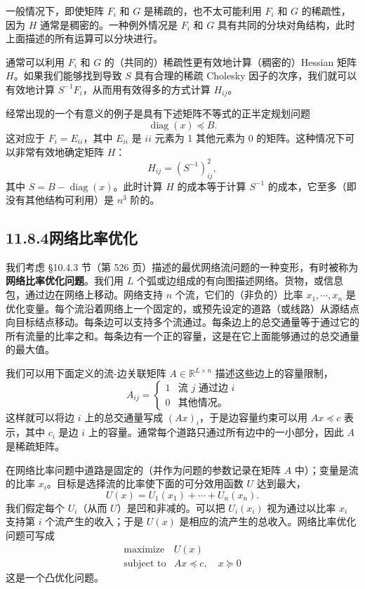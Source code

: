 \documentclass[UTF8,12pt,a4paper,fontset=fandol]{ctexart}
\begin{document}
一般情况下，即使矩阵 $F_i$ 和 $G$ 是稀疏的，也不太可能利用 $F_i$ 和 $G$ 的稀疏性，因为 $H$ 通常是稠密的。一种例外情况是 $F_i$ 和 $G$ 具有共同的分块对角结构，此时上面描述的所有运算可以分块进行。

通常可以利用 $F_i$ 和 $G$ 的（共同的）稀疏性更有效地计算（稠密的）Hessian 矩阵 $H$。如果我们能够找到导致 $S$ 具有合理的稀疏 Cholesky 因子的次序，我们就可以有效地计算 $S^{-1}F_i$，从而用有效得多的方式计算 $H_{ij}$。

经常出现的一个有意义的例子是具有下述矩阵不等式的正半定规划问题
\[
\operatorname{diag}(x)\preceq B.
\]
这对应于 $F_i=E_{ii}$，其中 $E_{ii}$ 是 $ii$ 元素为 1 其他元素为 0 的矩阵。这种情况下可以非常有效地确定矩阵 $H$：
\[
H_{ij}=(S^{-1})_{ij}^2,
\]
其中 $S=B-\operatorname{diag}(x)$。此时计算 $H$ 的成本等于计算 $S^{-1}$ 的成本，它至多（即没有其他结构可利用）是 $n^3$ 阶的。

\subsection*{11.8.4\quad 网络比率优化}

我们考虑 \S 10.4.3 节（第 526 页）描述的最优网络流问题的一种变形，有时被称为\textbf{网络比率优化问题}。我们用 $L$ 个弧或边组成的有向图描述网络。货物，或信息包，通过边在网络上移动。网络支持 $n$ 个流，它们的（非负的）比率 $x_1,\cdots,x_n$ 是优化变量。每个流沿着网络上一个固定的，或预先设定的道路（或线路）从源结点向目标结点移动。每条边可以支持多个流通过。每条边上的总交通量等于通过它的所有流量的比率之和。每条边有一个正的容量，这是在它上面能够通过的总交通量的最大值。

我们可以用下面定义的流-边关联矩阵 $A\in\mathbb{R}^{L\times n}$ 描述这些边上的容量限制，
\[
A_{ij}=
\begin{cases}
1 & \text{流 }j\text{ 通过边 }i\\
0 & \text{其他情况。}
\end{cases}
\]
这样就可以将边 $i$ 上的总交通量写成 $(Ax)_i$，于是边容量约束可以用 $Ax\preceq c$ 表示，其中 $c_i$ 是边 $i$ 上的容量。通常每个道路只通过所有边中的一小部分，因此 $A$ 是稀疏矩阵。

在网络比率问题中道路是固定的（并作为问题的参数记录在矩阵 $A$ 中）；变量是流的比率 $x_i$。目标是选择流的比率使下面的可分效用函数 $U$ 达到最大，
\[
U(x)=U_1(x_1)+\cdots+U_n(x_n).
\]
我们假定每个 $U_i$（从而 $U$）是凹和非减的。可以把 $U_i(x_i)$ 视为通过以比率 $x_i$ 支持第 $i$ 个流产生的收入；于是 $U(x)$ 是相应的流产生的总收入。网络比率优化问题可写成
\begin{equation}
\begin{array}{ll}
\text{maximize} & U(x)\\
\text{subject to} & Ax\preceq c,\quad x\succeq 0
\end{array}
\tag{11.62}
\end{equation}
这是一个凸优化问题。
\end{document}
